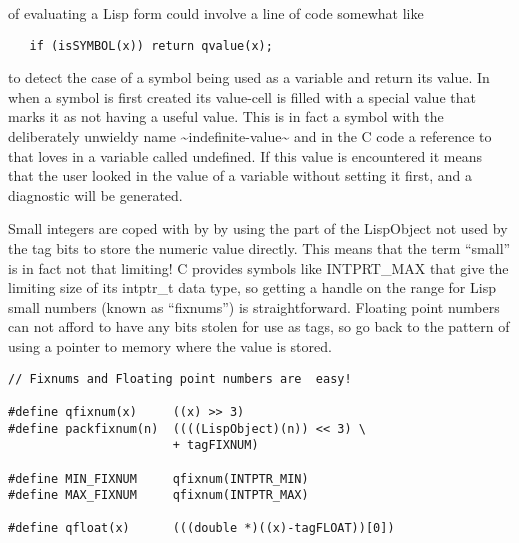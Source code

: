 of evaluating a Lisp form could involve a line of code
somewhat like
{\small\begin{verbatim}
   if (isSYMBOL(x)) return qvalue(x);
\end{verbatim}}
\noindent to detect the case of a symbol being used as a variable
and return its value. In \vsl{} when a symbol is first created its
value-cell is filled with a special value that marks it as not having
a useful value. This is in fact a symbol with the deliberately
unwieldy name {\tx \textasciitilde{}indefinite-value\textasciitilde{}} and in the C code a reference
to that loves in a variable called {\tx undefined}. If this value is
encountered it means that the user looked in the value of a variable
without setting it first, and a diagnostic will be generated.

Small integers are coped with by \vsl{} by using the part of the
{\tx LispObject} not used by the tag bits to store the numeric value
directly. This means that the term ``small'' is in fact not that
limiting! C provides symbols like {\tx INTPRT\_MAX} that give the limiting
size of its {\tx intptr\_t} data type, so getting a handle on the range
for Lisp small numbers (known as ``fixnums'') is straightforward. Floating
point numbers can not afford to have any bits stolen for use as tags, so go
back to the pattern of using a pointer to memory where the value is stored.
{\small\begin{verbatim}
// Fixnums and Floating point numbers are  easy!

#define qfixnum(x)     ((x) >> 3)
#define packfixnum(n)  ((((LispObject)(n)) << 3) \
                       + tagFIXNUM)

#define MIN_FIXNUM     qfixnum(INTPTR_MIN)
#define MAX_FIXNUM     qfixnum(INTPTR_MAX)

#define qfloat(x)      (((double *)((x)-tagFLOAT))[0])
\end{verbatim}}

